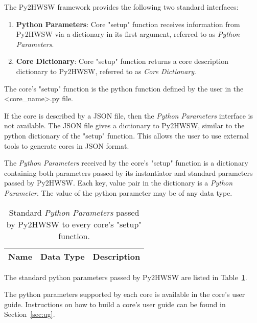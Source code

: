 %

The Py2HWSW framework provides the following two standard interfaces:
\begin{enumerate}
  \item \textbf{Python Parameters}: Core "setup" function receives information from Py2HWSW via a dictionary in its first argument, referred to as \textit{Python Parameters}.
  \item \textbf{Core Dictionary}: Core "setup" function returns a core description dictionary to Py2HWSW, referred to as \textit{Core Dictionary}.
\end{enumerate}

The core's "setup" function is the python function defined by the user in the <core\_name>.py file.

If the core is described by a JSON file, then the \textit{Python Parameters} interface is not available.
The JSON file gives a dictionary to Py2HWSW, similar to the python dictionary of the "setup" function.
This allows the user to use external tools to generate cores in JSON format.

%
%

The \textit{Python Parameters} received by the core's "setup" function is a dictionary containing both parameters passed by its instantiator and standard parameters passed by Py2HWSW.
Each key, value pair in the dictionary is a \textit{Python Parameter}.
The value of the python parameter may be of any data type.

\begin{table}[H]
  \centering
  \begin{tabularx}{\textwidth}{|l|l|X|}

    \hline
    \rowcolor{iob-green}
    {\bf Name} & {\bf Data Type} & {\bf Description}  \\ \hline \hline


  \end{tabularx}
  \caption{Standard \textit{Python Parameters} passed by Py2HWSW to every core's "setup" function.}
  \label{py2hwsw_py_params_tab}
\end{table}

The standard python parameters passed by Py2HWSW are listed in Table~\ref{py2hwsw_py_params_tab}.

The python parameters supported by each core is available in the core's user guide.
Instructions on how to build a core's user guide can be found in Section~\ref{sec:ug}. 


